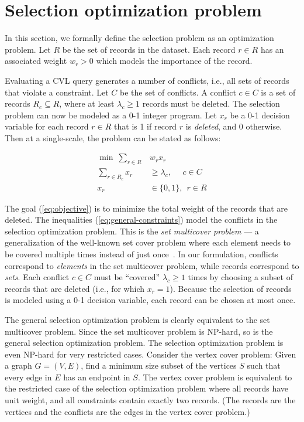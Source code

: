 \documentclass[11pt, oneside]{report}
\begin{document}
\section{Selection optimization problem}
\label{sec:optimizationmodel}

In this section, we formally define the selection problem as an optimization problem. Let $R$ be the set of records in the dataset. Each record $r \in R$ has an associated weight $w_r > 0$ which models the importance of the record. 

Evaluating a CVL query generates a number of conflicts, i.e., all sets of records that violate a constraint. Let $C$ be the set of conflicts. A conflict $c \in C$ is a set of records $R_c \subseteq R$, where at least $\lambda_c \geq 1$ records must be deleted. The selection problem can now be modeled as a 0-1 integer program. Let $x_r$ be a 0-1 decision variable for each record $r \in R$ that is 1 if record $r$ is \emph{deleted}, and 0 otherwise. Then at a single-scale, the problem can be stated as follows:

\begin{align}
  \label{eq:objective}
  \min ~\sum_{r \in R} &w_r x_r \\
  \label{eq:general-constraints}
  \sum_{r \in R_c} x_r &\geq \lambda_c, ~~~~~~ c \in C \\
  x_r & \in \{0, 1\}, ~~ r \in R
\end{align}

The goal (\ref{eq:objective}) is to minimize the total weight of the records that are deleted. The inequalities (\ref{eq:general-constraints}) model the conflicts in the selection optimization problem. This is the \emph{set multicover problem} --- a generalization of the well-known set cover problem where each element needs to be covered multiple times instead of just once~\cite{rajagopalan1998primal}. In our formulation, conflicts correspond to \textit{elements} in the set multicover problem, while records correspond to \textit{sets}. Each conflict $c \in C$ must be ``covered'' $\lambda_c \geq 1$ times by choosing a subset of records that are deleted (i.e., for which $x_r=1$). Because the selection of records is modeled using a 0-1 decision variable, each record can be chosen at most once.

The general selection optimization problem is clearly equivalent to the set multicover problem. Since the set multicover problem is NP-hard, so is the general selection optimization problem. The selection optimization problem is even NP-hard for very restricted cases. Consider the vertex cover problem: Given a graph $G=(V,E)$, find a minimum size subset of the vertices $S$ such that every edge in $E$ has an endpoint in $S$. The vertex cover problem is equivalent to the restricted case of the selection optimization problem where all records have unit weight, and all constraints contain exactly two records. (The records are the vertices and the conflicts are the edges in the vertex cover problem.)
\end{document}
